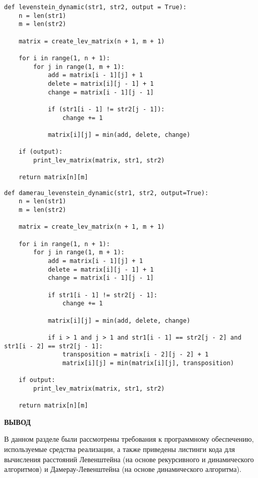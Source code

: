 \begin{center}
\captionsetup{justification=raggedright,singlelinecheck=off}
\begin{lstlisting}[label=lst:lev_table,caption=Функция нахождения расстояния Левенштейна динамически]
def levenstein_dynamic(str1, str2, output = True):
    n = len(str1)
    m = len(str2)

    matrix = create_lev_matrix(n + 1, m + 1)

    for i in range(1, n + 1):
        for j in range(1, m + 1):
            add = matrix[i - 1][j] + 1
            delete = matrix[i][j - 1] + 1
            change = matrix[i - 1][j - 1]
            
            if (str1[i - 1] != str2[j - 1]):
                change += 1

            matrix[i][j] = min(add, delete, change)

    if (output):
        print_lev_matrix(matrix, str1, str2)

    return matrix[n][m]
\end{lstlisting}
\end{center}

\clearpage

\begin{center}
\captionsetup{justification=raggedright,singlelinecheck=off}
\begin{lstlisting}[label=lst:dam_lev_dyn,caption=Функция нахождения расстояния Дамерау–Левенштейна динамически]
def damerau_levenstein_dynamic(str1, str2, output=True):
    n = len(str1)
    m = len(str2)

    matrix = create_lev_matrix(n + 1, m + 1)

    for i in range(1, n + 1):
        for j in range(1, m + 1):
            add = matrix[i - 1][j] + 1    
            delete = matrix[i][j - 1] + 1 
            change = matrix[i - 1][j - 1]

            if str1[i - 1] != str2[j - 1]:
                change += 1

            matrix[i][j] = min(add, delete, change)

            if i > 1 and j > 1 and str1[i - 1] == str2[j - 2] and str1[i - 2] == str2[j - 1]:
                transposition = matrix[i - 2][j - 2] + 1
                matrix[i][j] = min(matrix[i][j], transposition)

    if output:
        print_lev_matrix(matrix, str1, str2)

    return matrix[n][m]
\end{lstlisting}
\end{center}

\clearpage

\textbf{ВЫВОД}

В данном разделе были рассмотрены требования к программному обеспечению, используемые средства реализации, а также приведены листинги кода для вычисления расстояний Левенштейна (на основе рекурсивного и динамического алгоритмов) и Дамерау-Левенштейна (на основе динамического алгоритма).

\clearpage